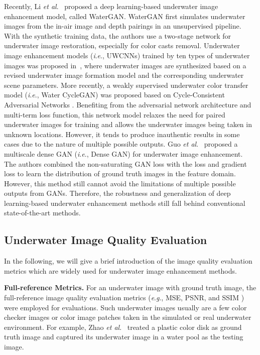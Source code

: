 \documentclass[journal]{IEEEtran}
\newcommand{\etal}{\textit{et al}.}
\newcommand{\ie}{\textit{i}.\textit{e}.}
\newcommand{\eg}{\textit{e}.\textit{g}.}
\begin{document}
Recently, Li \etal~\cite{WaterGAN} proposed a deep learning-based underwater image enhancement model, called WaterGAN. WaterGAN first simulates underwater images from the in-air image and depth pairings in an unsupervised pipeline. With the synthetic training data, the authors use a two-stage network for underwater image restoration, especially for color casts removal.
Underwater image enhancement models (\ie, UWCNNs) trained by ten types of underwater images was proposed in~\cite{UWCNN}, where underwater images are synthesized based on a revised underwater image formation model \cite{Akkaynak2017} and the corresponding underwater scene parameters.
More recently, a weakly supervised underwater color transfer model \cite{Emerging} (\ie, Water CycleGAN) was proposed based on Cycle-Consistent Adversarial Networks \cite{Cycle}. Benefiting from the adversarial network architecture and multi-term loss function, this network model relaxes the need for paired underwater images for training and allows the underwater images being taken in unknown locations. However, it tends to produce inauthentic results in some cases due to the nature of multiple possible outputs.
Guo \etal~\cite{Guo2019} proposed a multiscale dense GAN (\ie, Dense GAN) for underwater image enhancement. The authors combined the non-saturating GAN loss with the  loss and gradient loss to learn the distribution of ground truth images in the feature domain. However, this method still cannot avoid the limitations of multiple possible outputs from GANs.
Therefore, the robustness and generalization of deep learning-based underwater enhancement methods still fall behind conventional state-of-the-art methods.



\subsection{Underwater Image Quality Evaluation}

In the following, we will give a brief introduction of the image quality evaluation metrics which are widely used for underwater image enhancement methods.


\noindent
\textbf{Full-reference Metrics.} For an underwater image with ground truth image, the full-reference image quality evaluation metrics (\eg, MSE, PSNR, and SSIM \cite{SSIM}) were employed for evaluations. Such underwater images usually are a few color checker images or color image patches taken in the simulated or real underwater environment. For example, Zhao \etal~\cite{Zhao2015} treated a plastic color disk as ground truth image and captured its underwater image in a water pool as the testing image.
\end{document}

